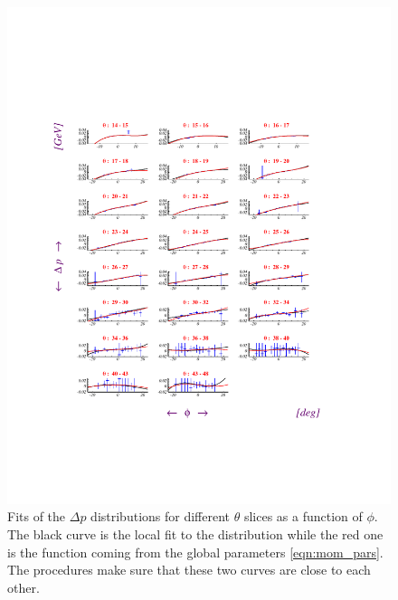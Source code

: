 \begin{figure}
 \begin{center}
 \includegraphics[width = 15cm, bb=70 120 500 640]{data_reduction/kine_corr/img/PHE_m}
  \caption[Fits of the $\Delta p$ distributions for different $\theta$ slices as a function of $\phi$]
          { Fits of the $\Delta p$ distributions for different $\theta$ slices as a function
                     of $\phi$. The black curve
                     is the local fit to the distribution while the red one is the function coming from the 
		     global parameters \ref{eqn:mom_pars}. The procedures make sure that these two curves are close
		     to each other.}
 \label{fig:corr_e_fits}
 \end{center}
\end{figure}
\cia

